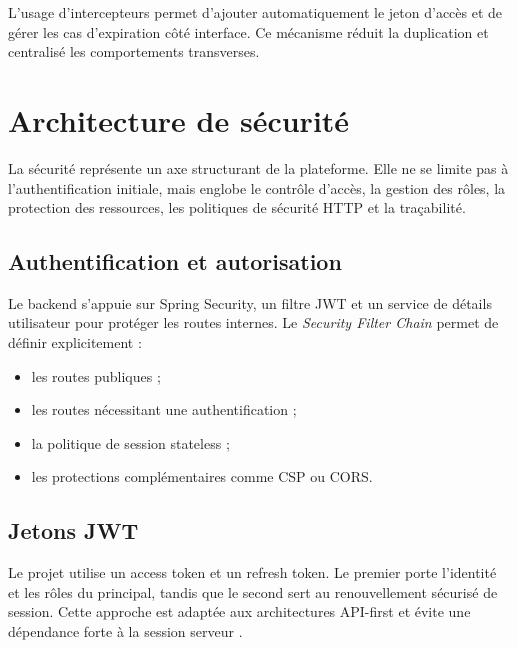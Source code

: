 L'usage d'intercepteurs permet d'ajouter automatiquement le jeton d'accès et de gérer les cas d'expiration côté interface. Ce mécanisme réduit la duplication et centralisé les comportements transverses.

\section{Architecture de sécurité}
La sécurité représente un axe structurant de la plateforme. Elle ne se limite pas à l'authentification initiale, mais englobe le contrôle d'accès, la gestion des rôles, la protection des ressources, les politiques de sécurité HTTP et la traçabilité.

\subsection{Authentification et autorisation}
Le backend s'appuie sur Spring Security, un filtre JWT et un service de détails utilisateur pour protéger les routes internes. Le \textit{Security Filter Chain} permet de définir explicitement :
\begin{itemize}
  \item les routes publiques ;
  \item les routes nécessitant une authentification ;
  \item la politique de session stateless ;
  \item les protections complémentaires comme CSP ou CORS.
\end{itemize}

\begin{codeblock}[H]
\caption{Configuration de sécurité du backend}

\end{codeblock}

\subsection{Jetons JWT}
Le projet utilise un access token et un refresh token. Le premier porte l'identité et les rôles du principal, tandis que le second sert au renouvellement sécurisé de session. Cette approche est adaptée aux architectures API-first et évite une dépendance forte à la session serveur \cite{owasp2021}.

\begin{codeblock}[H]
\caption{Génération des jetons JWT}

\end{codeblock}

